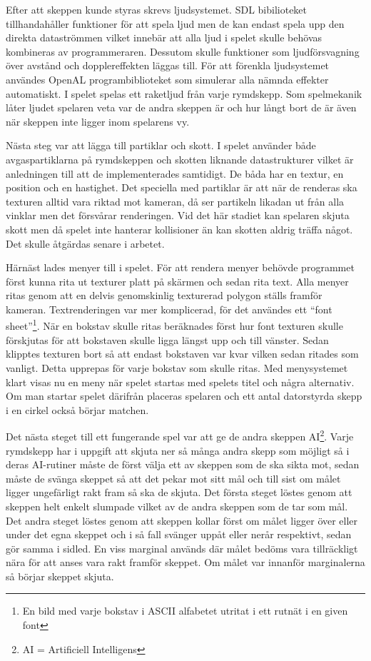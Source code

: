 \documentclass[12pt, a4paper]{article}
\begin{document}
	Efter att skeppen kunde styras skrevs ljudsystemet. SDL bibilioteket tillhandahåller funktioner för att spela ljud men de kan endast spela upp den direkta dataströmmen vilket innebär att alla ljud i spelet skulle behövas kombineras av programmeraren. Dessutom skulle funktioner som ljudförsvagning över avstånd och dopplereffekten läggas till. För att förenkla ljudsystemet användes OpenAL programbiblioteket som simulerar alla nämnda effekter automatiskt. I spelet spelas ett raketljud från varje rymdskepp. Som spelmekanik låter ljudet spelaren veta var de andra skeppen är och hur långt bort de är även när skeppen inte ligger inom spelarens vy. 
	
	Nästa steg var att lägga till partiklar och skott. I spelet använder både avgaspartiklarna på rymdskeppen och skotten liknande datastrukturer vilket är anledningen till att de implementerades samtidigt. De båda har en textur, en position och en hastighet. Det speciella med partiklar är att när de renderas ska texturen alltid vara riktad mot kameran, då ser partikeln likadan ut från alla vinklar men det försvårar renderingen. Vid det här stadiet kan spelaren skjuta skott men då spelet inte hanterar kollisioner än kan skotten aldrig träffa något. Det skulle åtgärdas senare i arbetet. 
	
	Härnäst lades menyer till i spelet. För att rendera menyer behövde programmet först kunna rita ut texturer platt på skärmen och sedan rita text. Alla menyer ritas genom att en delvis genomskinlig texturerad polygon ställs framför kameran. Textrenderingen var mer komplicerad, för det användes ett ``font sheet''\footnote{En bild med varje bokstav i ASCII alfabetet utritat i ett rutnät i en given font}. När en bokstav skulle ritas beräknades först hur font texturen skulle förskjutas för att bokstaven skulle ligga längst upp och till vänster. Sedan klipptes texturen bort så att endast bokstaven var kvar vilken sedan ritades som vanligt. Detta upprepas för varje bokstav som skulle ritas. Med menysystemet klart visas nu en meny när spelet startas med spelets titel och några alternativ. Om man startar spelet därifrån placeras spelaren och ett antal datorstyrda skepp i en cirkel också börjar matchen. 
	
	Det nästa steget till ett fungerande spel var att ge de andra skeppen AI\footnote{AI = Artificiell Intelligens}. Varje rymdskepp har i uppgift att skjuta ner så många andra skepp som möjligt så i deras AI-rutiner måste de först välja ett av skeppen som de ska sikta mot, sedan måste de svänga skeppet så att det pekar mot sitt mål och till sist om målet ligger ungefärligt rakt fram så ska de skjuta. Det första steget löstes genom att skeppen helt enkelt slumpade vilket av de andra skeppen som de tar som mål. Det andra steget löstes genom att skeppen kollar först om målet ligger över eller under det egna skeppet och i så fall svänger uppåt eller nerår respektivt, sedan gör samma i sidled. En viss marginal används där målet bedöms vara tillräckligt nära för att anses vara rakt framför skeppet. Om målet var innanför marginalerna så börjar skeppet skjuta. 
	
\end{document}
